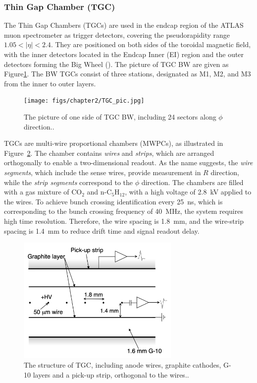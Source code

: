 \subsubsection{Thin Gap Chamber (TGC)} \label{sec:TGC}
The Thin Gap Chambers (TGCs) are used in the endcap region of the ATLAS muon spectrometer as trigger detectors, covering the pseudorapidity range $1.05 < |\eta| < 2.4$. They are positioned on both sides of the toroidal magnetic field, with the inner detectors located in the Endcap Inner (EI) region and the outer detectors forming the Big Wheel (\BW). The picture of TGC BW are given as Figure\ref{fig:TGC_pic}. The BW TGCs consist of three stations, designated as M1, M2, and M3 from the inner to outer layers.

\begin{figure}[htbp]
  \centering
  \texttt{[image: figs/chapter2/TGC\_pic.jpg]}
  \caption{The picture of one side of TGC BW, including 24 sectors along $\phi$ direction.\cite{TGCInstallation}.}
  \label{fig:TGC_pic}
\end{figure}

TGCs are multi-wire proportional chambers (MWPCs), as illustrated in Figure~\ref{fig:TGC_cross_section}. The chamber contains \textit{wires} and \textit{strips}, which are arranged orthogonally to enable a two-dimensional readout. As the name suggests, the \textit{wire segments}, which include the sense wires, provide measurement in $R$ direction, while the \textit{strip segments} correspond to the $\phi$ direction. The chambers are filled with a gas mixture of CO$_2$ and n-C$_5$H$_{12}$, with a high voltage of 2.8~kV applied to the wires. To achieve bunch crossing identification every 25~ns, which is corresponding to the bunch crossing frequency of 40~MHz, the system requires high time resolution. Therefore, the wire spacing is 1.8~mm, and the wire-strip spacing is 1.4~mm to reduce drift time and signal readout delay.

\begin{figure}[htbp]
  \centering
  \includegraphics[width=0.7\textwidth]{figs/chapter2/TGC_cross_section.png}
  \caption{The structure of TGC, including anode wires, graphite cathodes, G-10 layers and a pick-up strip, orthogonal to the wires.\cite{ATLASDetector2008}.}
  \label{fig:TGC_cross_section}
\end{figure}

